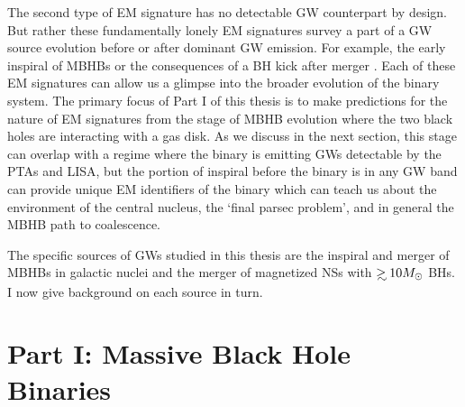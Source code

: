 The second type of EM signature has no detectable GW counterpart by design.
But rather these fundamentally lonely EM signatures survey a part of a GW
source evolution before or after dominant GW emission. For example, the early
inspiral of MBHBs \citep{Haiman+2008, HKM09} or the consequences of a BH kick
after merger \citep{BHkicks_aftermerger}. Each of these EM signatures can allow us a
glimpse into the broader evolution of the binary system. The primary focus of
Part I of this thesis is to make predictions for the nature of EM signatures
from the stage of MBHB evolution where the two black holes are interacting
with a gas disk. As we discuss in the next section, this stage can overlap
with a regime where the binary is emitting GWs detectable by the PTAs and
LISA, but the portion of inspiral before the binary is in any GW band
can provide unique EM identifiers of the binary which can teach us about the
environment of the central nucleus, the `final parsec problem', and in general
the MBHB path to coalescence.





 



The specific sources of GWs studied in this thesis are the inspiral and merger
of MBHBs in galactic nuclei and the merger of magnetized NSs with $\gsim 10
\Msun$ BHs. I now give background on each source in turn.

\section{Part I: Massive Black Hole Binaries} %

